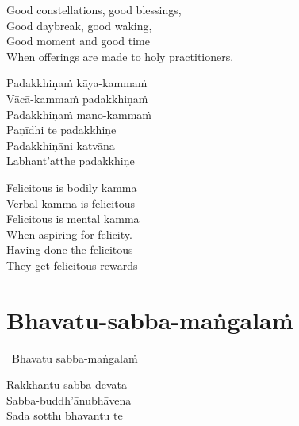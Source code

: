 \begin{english-verses}
  Good constellations, good blessings,\\
  Good daybreak, good waking,\\
  Good moment and good time\\
  When offerings are made to holy practitioners.
\end{english-verses}

\begin{pali-hang-continued}
  Padakkhiṇaṁ kāya-kammaṁ\\
  Vācā-kammaṁ padakkhiṇaṁ\\
  Padakkhiṇaṁ mano-kammaṁ\\
  Paṇīdhi te padakkhiṇe\makeatletter\hyperlink{endnote130-appendix}\makeatother\\
  Padakkhiṇāni katvāna\\
  Labhant'atthe padakkhiṇe
\end{pali-hang-continued}

\begin{english-verses}
  Felicitous is bodily kamma\\
  Verbal kamma is felicitous\\
  Felicitous is mental kamma\\
  When aspiring for felicity.\\
  Having done the felicitous\\
  They get felicitous rewards
\end{english-verses}

\suttaRef{[AN 3.155]}

\section{Bhavatu-sabba-maṅgalaṁ}
\label{bhavatu-sabba-mangalam-protective}

\begin{pali-leader}
  \anglebracketleft\ \hspace{-0.5mm}Bhavatu sabba-maṅgalaṁ \hspace{-0.5mm}\anglebracketright\
\end{pali-leader}
\begin{pali-hangtogether}
  Rakkhantu sabba-devatā\\
  Sabba-buddh'ānubhāvena\\
  Sadā sotthī bhavantu te
\end{pali-hangtogether}

